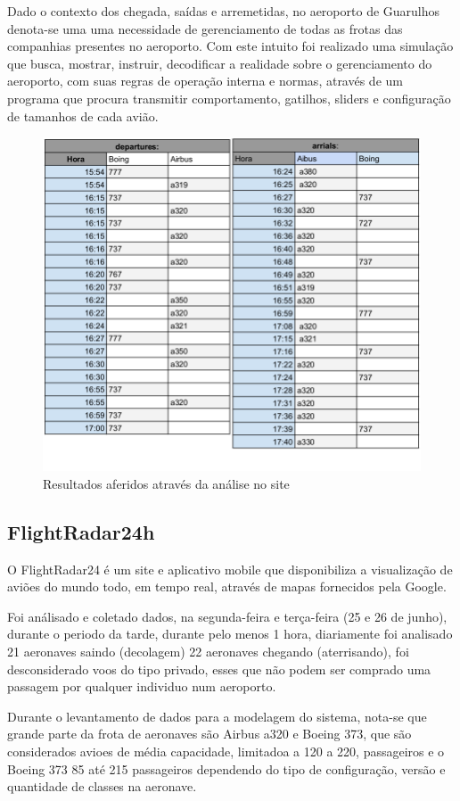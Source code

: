 \documentclass[12pt]{article}
\begin{document}
  Dado o contexto dos chegada, saídas e arremetidas, no aeroporto de Guarulhos denota-se uma
  uma necessidade de gerenciamento de todas as frotas das companhias presentes no aeroporto.
  Com este intuito foi realizado uma simulação que busca, mostrar, instruir, decodificar a
  realidade sobre o gerenciamento do aeroporto, com suas regras de operação interna e normas, 
  através de um programa que procura transmitir comportamento, gatilhos, sliders e configuração
  de tamanhos de cada avião.
  
  \begin{figure}[ht]
    \centering
    \includegraphics[width=.6\textwidth]{dados.png}
    \caption{Resultados aferidos através da análise no site}
    \label{fig:saida}
  \end{figure}
  
  \subsection{FlightRadar24h}
  
  O  FlightRadar24 é um site e aplicativo mobile que disponibiliza a
  visualização de aviões do mundo todo, em tempo real, através de mapas 
  fornecidos pela Google.
  
  Foi análisado e coletado dados, na segunda-feira e terça-feira (25 e 26 de junho), durante 
  o periodo da tarde, durante pelo menos 1 hora, diariamente foi analisado 21
  aeronaves saindo (decolagem) 22 aeronaves chegando (aterrisando), foi desconsiderado voos do 
  tipo privado, esses que não podem ser comprado uma passagem por qualquer
  individuo num aeroporto.
  
  Durante o levantamento de dados para a modelagem do sistema, nota-se que grande parte
  da frota de aeronaves são Airbus a320 e Boeing 373, que são considerados avioes de média
  capacidade, limitadoa a 120 a 220, passageiros e o Boeing 373 85 até 215 passageiros 
  dependendo do tipo de configuração, versão e quantidade de classes na aeronave.
  
\end{document}
